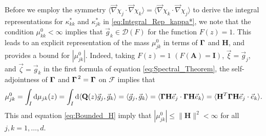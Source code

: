 \documentclass[11pt]{amsart}
\renewcommand{\d}{\mathrm{d}}
\newcommand{\Hb}{\mathbf{H}}
\newcommand{\Ib}{\mathbf{I}}
\newcommand{\Ab}{\mathbf{A}}
\newcommand{\Qb}{\mathbf{Q}}
\newcommand{\Ds}{\mathscr{D}}
\newcommand{\Fs}{\mathscr{F}}
\newcommand\bGamma{\mbox{\boldmath${\Gamma}$}}
\begin{document}
Before we employ the symmetry
$\langle\vec{\nabla}\chi_j\cdot\vec{\nabla}\chi_k\rangle=\langle\vec{\nabla}\chi_k\cdot\vec{\nabla}\chi_j\rangle$ to derive the 
integral representations for $\kappa^*_{kk}$ and $\kappa^*_{jk}$ in
\eqref{eq:Integral_Rep_kappa*},  we note that the condition
$\mu^0_{kk}<\infty$ implies that $\vec{g}_k\in\Ds(F)$ for the function 
$F(z)=1$. This leads to an explicit representation of the mass
$\mu^0_{jk}$ in terms of $\bGamma$ and $\Hb$, and provides a bound for
$|\mu^0_{jk}|$. Indeed, taking $F(z)=1$ $(F(\Ab)=\Ib)$, 
$\vec{\xi}=\vec{g}_j$, and $\vec{\zeta}=\vec{g}_k$ in the first formula of
equation \eqref{eq:Spectral_Theorem}, the self-adjointness of $\bGamma$
and $\bGamma^{\,2}=\bGamma$ on $\Fs$ implies that   
%
\begin{align}\label{eq:Mass}
  \mu^0_{jk}=\int_I\d\mu_{jk}(z)
        =\int_I\d\langle\Qb(z)\vec{g}_j,\vec{g}_k\rangle
        =\langle\vec{g}_j,\vec{g}_k\rangle
        =\langle\bGamma\Hb\vec{e}_j\cdot\bGamma\Hb\vec{e}_k\rangle 
        =\langle\Hb^T\bGamma\Hb\vec{e}_j\cdot\vec{e}_k\rangle.     
\end{align}
%
This and equation \eqref{eq:Bounded_H} imply that
$|\mu^0_{jk}|\leq\|\Hb\|^2<\infty$ for all $j,k=1,\ldots,d$.  
\end{document}
